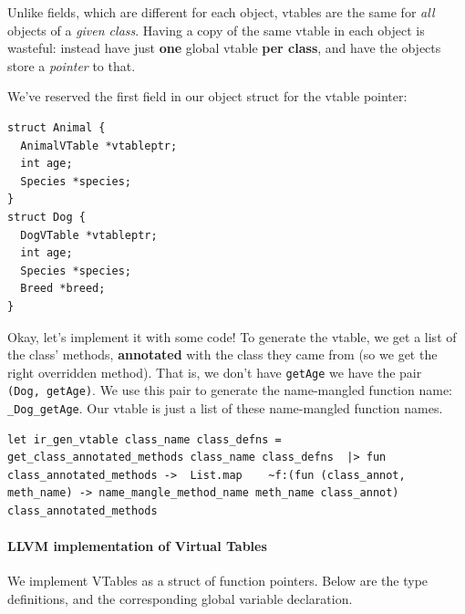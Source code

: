 Unlike fields, which are different for each object, vtables are the same
for \emph{all} objects of a \emph{given class}. Having a copy of the
same vtable in each object is wasteful: instead have just \textbf{one}
global vtable \textbf{per class}, and have the objects store a
\emph{pointer} to that.

We've reserved the first field in our object struct for the vtable
pointer:


\begin{verbatim}
struct Animal {
  AnimalVTable *vtableptr;
  int age;
  Species *species;
}
struct Dog {
  DogVTable *vtableptr;
  int age;
  Species *species;
  Breed *breed;
}
\end{verbatim}

Okay, let's implement it with some code! To generate the vtable, we get
a list of the class' methods, \textbf{annotated} with the class they
came from (so we get the right overridden method). That is, we don't
have \texttt{getAge} we have the pair \texttt{(Dog,\ getAge)}. We use
this pair to generate the name-mangled function name:
\texttt{\_Dog\_getAge}. Our vtable is just a list of these name-mangled
function names.

%

\begin{lstlisting}[language=caml,caption={ir\_gen\_env.ml}]
let ir_gen_vtable class_name class_defns =  get_class_annotated_methods class_name class_defns  |> fun class_annotated_methods ->  List.map    ~f:(fun (class_annot, meth_name) -> name_mangle_method_name meth_name class_annot)    class_annotated_methods
\end{lstlisting}

\hypertarget{llvm-implementation-of-virtual-tables}{%
\paragraph{\texorpdfstring{\protect\hyperlink{llvm-implementation-of-virtual-tables}{}LLVM
implementation of Virtual
Tables}{LLVM implementation of Virtual Tables}}\label{llvm-implementation-of-virtual-tables}}

We implement VTables as a struct of function pointers. Below are the
type definitions, and the corresponding global variable declaration.

%

